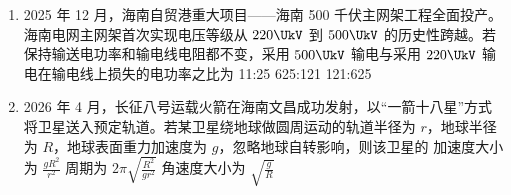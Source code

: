 \documentclass[\gkver]{gaokaozhenti}
\begin{document}
\begin{enumerate}
{由几何关系可知：反射光线与界面的夹角为 $90^{\circ}-60^{\circ}=30^{\circ}$；

因此折射光线与界面的夹角为 $75^{\circ}-30^{\circ}=45^{\circ}$；

由此可得折射角（折射光线与法线的夹角）$r=90^{\circ}-45^{\circ}=45^{\circ}$；

根据光的折射定律 $n=\frac{\sin 60^{\circ}}{\sin 45^{\circ}}=\frac{\sqrt{6}}{2}$。

故选 B。
}

\item
2025 年 12 月，海南自贸港重大项目——海南 500 千伏主网架工程全面投产。海南电网主网架首次实现电压等级从 $220 \UkV$ 到 $500 \UkV$ 的历史性跨越。若保持输送电功率和输电线电阻都不变，采用 $500 \UkV$ 输电与采用 $220 \UkV$ 输电在输电线上损失的电功率之比为
{11:25}
{625:121}
{121:625}


\item
2026 年 4 月，长征八号运载火箭在海南文昌成功发射，以“一箭十八星”方式将卫星送入预定轨道。若某卫星绕地球做圆周运动的轨道半径为 $r$，地球半径为 $R$，地球表面重力加速度为 $g$，忽略地球自转影响，则该卫星的
{加速度大小为 $\frac{gR^{2}}{r^{2}}$}
{周期为 $2\pi\sqrt{\frac{R^{2}}{gr^{2}}}$}
{角速度大小为 $\sqrt{\frac{g}{R}}$}

\end{enumerate}
\end{document}
